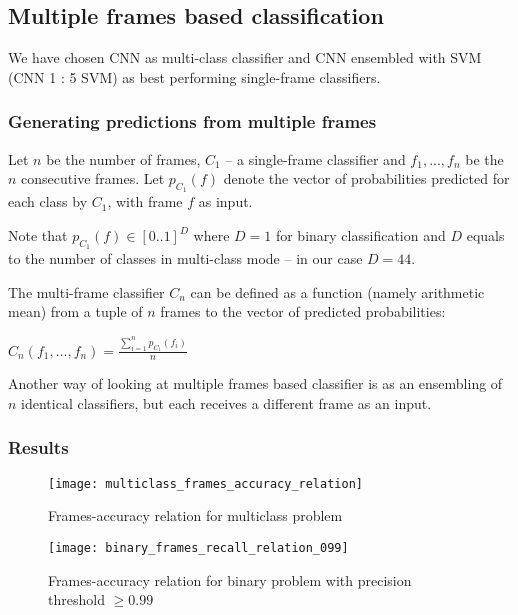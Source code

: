     \subsection{Multiple frames based classification}
    We have chosen CNN as multi-class classifier and CNN ensembled with SVM (CNN 1 : 5 SVM) as
    best performing single-frame classifiers.

    \subsubsection{Generating predictions from multiple frames}
    Let $n$ be the number of frames, $C_{1}$ -- a single-frame classifier and
    $f_1, ..., f_n$ be the $n$ consecutive frames.
    Let $p_{C_{1}}(f)$ denote the vector of probabilities predicted for each class by $C_{1}$,
    with frame $f$ as input.

    Note that $p_{C_{1}}(f) \in [0..1]^D$ where $D = 1$ for binary classification
    and $D$ equals to the number of classes in multi-class mode -- in our case $D = 44$.


    The multi-frame classifier $C_{n}$ can be defined as a function (namely arithmetic mean)
    from a tuple of $n$ frames to the vector of predicted probabilities:

    \begin{center}
    $C_{n}(f_1, ..., f_n) = \frac{\sum\limits_{i=1}^{n}{p_{C_{1}}(f_{i})}}{n}$
    \end{center}

    Another way of looking at multiple frames based classifier is as an ensembling
    of $n$ identical classifiers, but each receives a different frame as an input.

    \subsubsection{Results}
    \begin{figure}[H]
    \caption{Frames-accuracy relation for multiclass problem}
    \centering
    \texttt{[image: multiclass\_frames\_accuracy\_relation]}
    \end{figure}

    \begin{figure}[H]
    \caption{Frames-accuracy relation for binary problem with precision threshold $\geqslant 0.99$}
    \centering
    \texttt{[image: binary\_frames\_recall\_relation\_099]}
    \end{figure}

